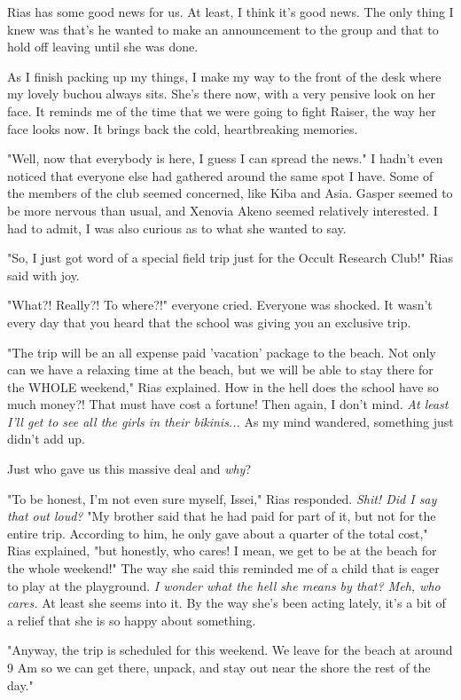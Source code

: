 \documentclass{article}
\begin{document}
Rias has some good news for us. At least, I think it's good news. The only thing I knew was that's he wanted to make an announcement to the group and that to hold off leaving until she was done.

As I finish packing up my things, I make my way to the front of the desk where my lovely buchou always sits. She's there now, with a very pensive look on her face. It reminds me of the time that we were going to fight Raiser, the way her face looks now. It brings back the cold, heartbreaking memories.

"Well, now that everybody is here, I guess I can spread the news." I hadn't even noticed that everyone else had gathered around the same spot I have. Some of the members of the club seemed concerned, like Kiba and Asia. Gasper seemed to be more nervous than usual, and Xenovia Akeno seemed relatively interested. I had to admit, I was also curious as to what she wanted to say.

"So, I just got word of a special field trip just for the Occult Research Club!" Rias said with joy.

"What?! Really?! To where?!" everyone cried. Everyone was shocked. It wasn't every day that you heard that the school was giving you an exclusive trip.

"The trip will be an all expense paid 'vacation' package to the beach. Not only can we have a relaxing time at the beach, but we will be able to stay there for the WHOLE weekend," Rias explained. How in the hell does the school have so much money?! That must have cost a fortune! Then again, I don't mind. \emph{At least I'll get to see all the girls in their bikinis...} As my mind wandered, something just didn't add up. 

Just who gave us this massive deal and \emph{why}?

"To be honest, I'm not even sure myself, Issei," Rias responded. \emph{Shit! Did I say that out loud?} "My brother said that he had paid for part of it, but not for the entire trip. According to him, he only gave about a quarter of the total cost," Rias explained, "but honestly, who cares! I mean, we get to be at the beach for the whole weekend!" The way she said this reminded me of a child that is eager to play at the playground. \emph{I wonder what the hell she means by that? Meh, who cares.} At least she seems into it. By the way she's been acting lately, it's a bit of a relief that she is so happy about something.

"Anyway, the trip is scheduled for this weekend. We leave for the beach at around 9 Am so we can get there, unpack, and stay out near the shore the rest of the day."
\end{document}
